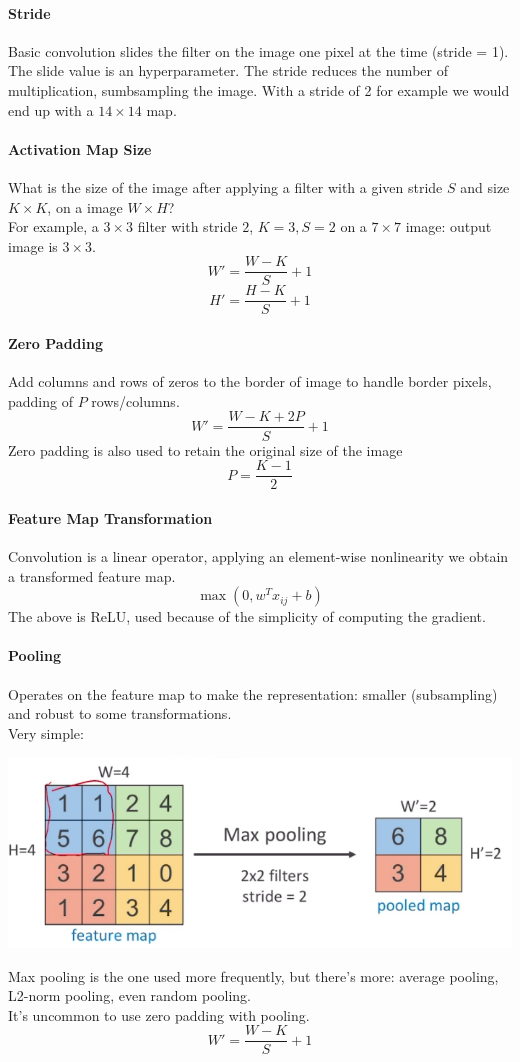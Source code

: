 \documentclass[10pt]{report}
\begin{document}
\paragraph{Stride} Basic convolution slides the filter on the image one pixel at the time (stride = 1). The slide value is an hyperparameter. The stride reduces the number of multiplication, sumbsampling the image. With a stride of 2 for example we would end up with a $14\times14$ map.
\paragraph{Activation Map Size} What is the size of the image after applying a filter with a given stride $S$ and size $K\times K$, on a image $W\times H$?\\
For example, a $3\times 3$ filter with stride $2$, $K=3, S=2$ on a $7\times 7$ image: output image is $3\times 3$.
$$W'=\frac{W-K}{S}+1$$
$$H'=\frac{H-K}{S}+1$$
\paragraph{Zero Padding} Add columns and rows of zeros to the border of image to handle border pixels, padding of $P$ rows/columns.
$$W'=\frac{W-K+2P}{S}+1$$
Zero padding is also used to retain the original size of the image
$$P=\frac{K-1}{2}$$
\paragraph{Feature Map Transformation} Convolution is a linear operator, applying an element-wise nonlinearity we obtain a transformed feature map.
$$\max(0, w^Tx_{ij} + b)$$
The above is ReLU, used because of the simplicity of computing the gradient.
\paragraph{Pooling} Operates on the feature map to make the representation: smaller (subsampling) and robust to some transformations.\\
Very simple: \begin{center}
	\includegraphics[scale=0.5]{54.png}
\end{center}
Max pooling is the one used more frequently, but there's more: average pooling, L2-norm pooling, even random pooling.\\
It's uncommon to use zero padding with pooling.
$$W' = \frac{W-K}{S} + 1$$
\end{document}
